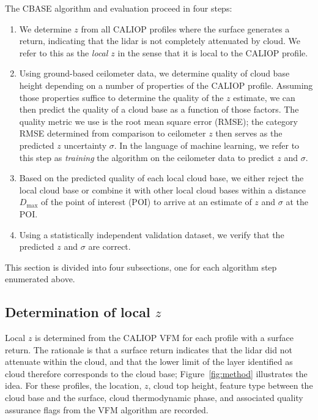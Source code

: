 \documentclass[essd,manuscript]{copernicus}\usepackage[]{graphicx}\usepackage[]{color}
\newcommand\CBH{\ensuremath{z}}
\begin{document}
The CBASE algorithm and evaluation proceed in four steps:
\begin{enumerate}
\item We determine \CBH{} from all CALIOP profiles where the
  surface generates a return, indicating that the lidar is not completely
  attenuated by cloud.  We refer to this as the \textit{local
    \CBH{}} in the sense that it is local to the CALIOP profile.
\item Using ground-based ceilometer data, we determine quality of cloud base
  height depending on a number of properties of the CALIOP profile.  Assuming
  those properties suffice to determine the quality of the \CBH{} estimate, we
  can then predict the quality of a cloud base as a function of those factors.
  The quality metric we use is the root mean square error (RMSE); the category
  RMSE determined from comparison to ceilometer \CBH{} then serves as the predicted
  \CBH{} uncertainty $\sigma$.  In the language of machine learning, we refer to this step
  as \textit{training} the algorithm on the ceilometer data to predict \CBH{} and
  $\sigma$.
\item Based on the predicted quality of each local cloud base, we either reject
  the local cloud base or combine it with other local cloud bases within a
  distance $D_\text{max}$ of the point of interest (POI) to arrive at an 
  estimate of \CBH{} and $\sigma$ at the POI.
\item Using a statistically independent validation dataset, we verify that the
  predicted \CBH{} and $\sigma$ are correct.
\end{enumerate}

This section is divided into four subsections, one for each algorithm step
enumerated above.

\subsection{Determination of local \CBH{}}
\label{sec:algorithm:local}
Local \CBH{} is determined from the CALIOP VFM for each profile with a surface
return.  The rationale is that a surface return indicates that the lidar did not
attenuate within the cloud, and that the lower limit of the layer identified as
cloud therefore corresponds to the cloud base; Figure~\ref{fig:method}
illustrates the idea.  For these profiles, the location, \CBH{}, cloud top height,
feature type between the cloud base and the surface,
cloud thermodynamic phase, and associated quality assurance flags from the VFM
algorithm are recorded.
\end{document}
